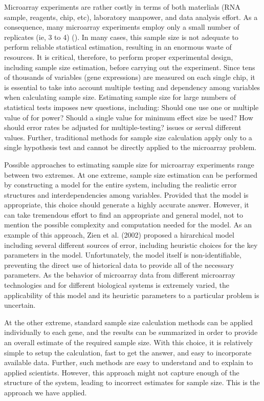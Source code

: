 \documentclass{bioinfo}
\begin{document}
Microarray experiments are rather costly in terms of both materlials
(RNA sample, reagents, chip, etc), laboratory manpower, and data
analysis effort.  As a consequence, many microarray experiments employ
only a small number of replicates (ie, 3 to 4) (\citealp{Mandel03}).
In many cases, this sample size is not adequate to perform reliable
statistical estimation, resulting in an enormous waste of resources.
It is critical, therefore, to perform proper experimental design,
including sample size estimation, before carrying out the experiment.
Since tens of thousands of variables (gene expressions) are measured
on each single chip, it is essential to take into account multiple
testing and dependency among variables when calculating sample size.
Estimating sample size for large numbers of statistical tests imposes
new questions, including: Should one use one or multiple value of for
power? Should a single value for minimum effect size be used?  How
should error rates be adjusted for multiple-testing?  issues or serval
different values.  Further, traditional methods for sample size
calculation apply only to a single hypothesis test and cannot be
directly applied to the microarray problem.

Possible approaches to estimating sample size for microarray
experiments range between two extremes. At one extreme, sample size
estimation can be performed by constructing a model for the entire
system, including the realistic error structures and interdependencies
among variables. Provided that the model is appropriate, this choice
should generate a highly accurate answer. However, it can take
tremendous effort to find an appropriate and general model, not to
mention the possible complexity and computation needed for the model.
As an example of this approach, Zien et al.  (2002) proposed a
hirarchical model including several different sources of error,
including heuristic choices for the key parameters in the model.
Unfortunately, the model itself is non-identifiable, preventing the
direct use of historical data to provide all of the necessary
parameters.  As the behavior of microarray data from different
microarray technologies and for different biological systems is
extremely varied, the applicability of this model and its heuristic
parameters to a particular problem is uncertain.

At the other extreme, standard sample size calculation methods can be
applied individually to each gene, and the results can be summarized
in order to provide an overall estimate of the required sample size.
With this choice, it is relatively simple to setup the calculation,
fast to get the answer, and easy to incorporate available data.
Further, such methods are easy to understand and to explain to applied
scientists.  However, this approach might not capture enough of the
structure of the system, leading to incorrect estimates for sample
size.  This is the approach we have applied.
\end{document}
